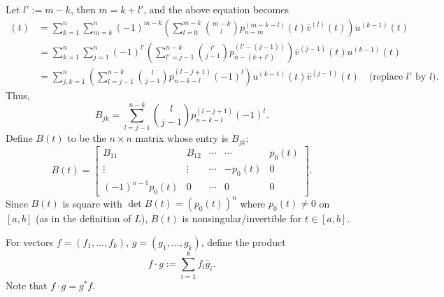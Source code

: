 \documentclass[11pt, oneside, a4paper]{article}
\begin{document}
\begin{rmk}
{    Let $l':=m-k$, then $m=k+l'$, and the above equation becomes
    \begin{align*}
        [uv](t) &= \sum_{k=1}^n\sum_{m=k}^n(-1)^{m-k}\left(\sum_{l=0}^{m-k}\binom{m-k}{l}p_{n-m}^{(m-k-l)}(t)\bar{v}^{(l)}(t)\right)u^{(k-1)}(t)\\
        &= \sum_{k=1}^n\sum_{j=1}^n (-1)^{l'}\left(\sum_{l'=j-1}^{n-k}\binom{l'}{j-1}p_{n-(k+l')}^{(l'-(j-1))}\right)\bar{v}^{(j-1)}(t)u^{(k-1)}(t)\\
        &= \sum_{j,k=1}^n \left(\sum_{l=j-1}^{n-k}\binom{l}{j-1}p^{(l-j+1)}_{n-k-l}(-1)^l\right)u^{(k-1)}(t)\bar{v}^{(j-1)}(t)\quad\mbox{(replace $l'$ by $l$)}.
    \end{align*}
    Thus,
    \[B_{jk} = \sum_{l=j-1}^{n-k}\binom{l}{j-1}p^{(l-j+1)}_{n-k-l}(-1)^l.\]
    }
    Define $B(t)$ to be the $n\times n$ matrix whose entry is $B_{jk}$:
    \begin{equation}\label{B(t)}
        B(t)=\begin{bmatrix}
            B_{11} & B_{12} & \cdots & \cdots & p_0(t)\\
            \vdots & \vdots & \cdots & -p_0(t) & 0\\
            (-1)^{n-1}p_0(t) & 0 & \cdots & 0 & 0
        \end{bmatrix}.
    \end{equation}
    Since $B(t)$ is square with $\det B(t)=(p_0(t))^n$ where $p_0(t)\neq 0$ on $[a,b]$ (as in the definition of $L$), $B(t)$ is nonsingular/invertible for $t\in [a,b]$.
\end{rmk}

\begin{defn}\label{defn:f cdot g}
    For vectors $f=(f_1,\ldots,f_k)$, $g=(g_1,\ldots,g_k)$, define the product
    \[f\cdot g:=\sum_{i=1}^k f_i\bar{g}_i.\]
    Note that $f\cdot g = g^*f$.
\end{defn}
\end{document}
